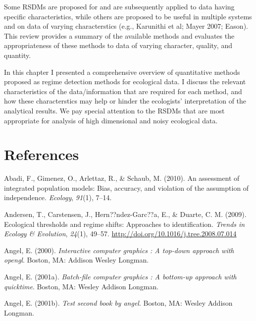 \documentclass[12pt,twoside,openany]{reedthesis}
\begin{document}
Some RSDMs are proposed for and are subsequently applied to data having
specific characteristics, while others are proposed to be useful in
multiple systems and on data of varying characterstics (e.g., Karunithi
et al; Mayer 2007; Eason). This review provides a summary of the
available methods and evaluates the appropriateness of these methods to
data of varying character, quality, and quantity.

In this chapter I presented a comprehensive overview of quantitative
methods proposed as regime detection methods for ecological data. I
discuss the relevant characteristics of the data/information that are
required for each method, and how these characterstics may help or
hinder the ecologists' interpretation of the analytical results. We pay
special attention to the RSDMs that are most appropriate for analysis of
high dimensional and noisy ecological data.

\backmatter

\chapter*{References}\label{references}


\noindent

\setlength{\parindent}{-0.20in} \setlength{\leftskip}{0.20in}
\setlength{\parskip}{8pt}

\hypertarget{refs}{}
\hypertarget{ref-abadi2010assessment}{}
Abadi, F., Gimenez, O., Arlettaz, R., \& Schaub, M. (2010). An
assessment of integrated population models: Bias, accuracy, and
violation of the assumption of independence. \emph{Ecology},
\emph{91}(1), 7--14.

\hypertarget{ref-andersen_ecological_2009}{}
Andersen, T., Carstensen, J., Hern??ndez-Garc??a, E., \& Duarte, C. M.
(2009). Ecological thresholds and regime shifts: Approaches to
identification. \emph{Trends in Ecology \& Evolution}, \emph{24}(1),
49--57. \url{http://doi.org/10.1016/j.tree.2008.07.014}

\hypertarget{ref-angel2000}{}
Angel, E. (2000). \emph{Interactive computer graphics : A top-down
approach with opengl}. Boston, MA: Addison Wesley Longman.

\hypertarget{ref-angel2001}{}
Angel, E. (2001a). \emph{Batch-file computer graphics : A bottom-up
approach with quicktime}. Boston, MA: Wesley Addison Longman.

\hypertarget{ref-angel2002a}{}
Angel, E. (2001b). \emph{Test second book by angel}. Boston, MA: Wesley
Addison Longman.
\end{document}
